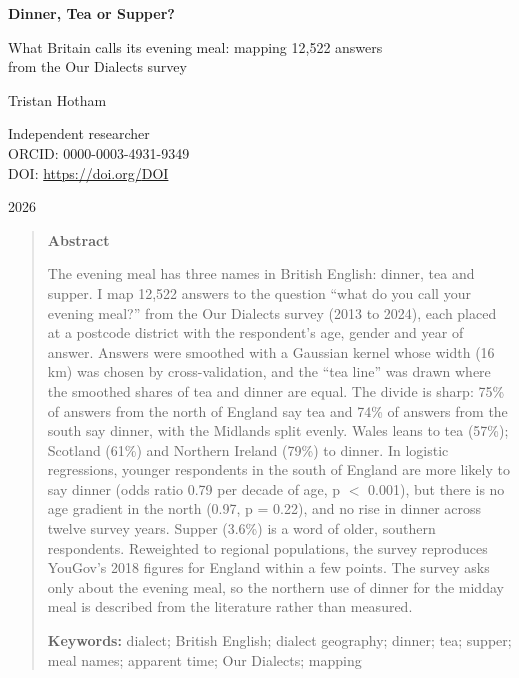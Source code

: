 \documentclass[11pt,a4paper]{article}
\begin{document}
\begin{center}
{\Large\bfseries Dinner, Tea or Supper?\par}
\vspace{0.4em}
{\large What Britain calls its evening meal: mapping 12,522 answers\\from the Our Dialects survey\par}
\vspace{1.2em}
{\large Tristan Hotham\par}
\vspace{0.3em}
{\small Independent researcher\\
ORCID: 0000-0003-4931-9349\\
DOI: \href{https://doi.org/{{DOI}}}{https://doi.org/{{DOI}}}\par}
\vspace{0.8em}
2026
\end{center}

\begin{quote}
\small
\begin{center}\textbf{Abstract}\end{center}
The evening meal has three names in British English: dinner, tea and supper. I map 12,522 answers to the question ``what do you call your evening meal?'' from the Our Dialects survey (2013 to 2024), each placed at a postcode district with the respondent's age, gender and year of answer. Answers were smoothed with a Gaussian kernel whose width (16 km) was chosen by cross-validation, and the ``tea line'' was drawn where the smoothed shares of tea and dinner are equal. The divide is sharp: 75\% of answers from the north of England say tea and 74\% of answers from the south say dinner, with the Midlands split evenly. Wales leans to tea (57\%); Scotland (61\%) and Northern Ireland (79\%) to dinner. In logistic regressions, younger respondents in the south of England are more likely to say dinner (odds ratio 0.79 per decade of age, p $<$ 0.001), but there is no age gradient in the north (0.97, p = 0.22), and no rise in dinner across twelve survey years. Supper (3.6\%) is a word of older, southern respondents. Reweighted to regional populations, the survey reproduces YouGov's 2018 figures for England within a few points. The survey asks only about the evening meal, so the northern use of dinner for the midday meal is described from the literature rather than measured.

\textbf{Keywords:} dialect; British English; dialect geography; dinner; tea; supper; meal names; apparent time; Our Dialects; mapping
\end{quote}
\end{document}
